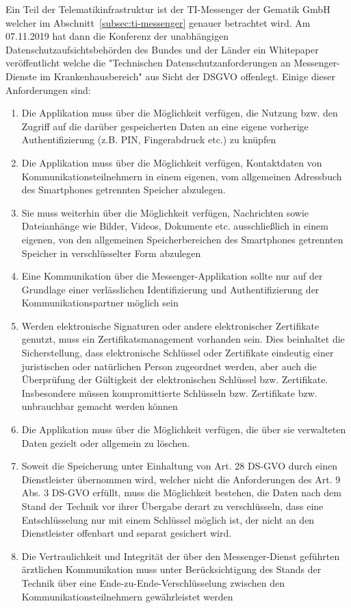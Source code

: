     Ein Teil der Telematikinfrastruktur ist der TI-Messenger der Gematik GmbH welcher im Abschnitt~\ref{subsec:ti-messenger} genauer betrachtet wird.
    Am 07.11.2019 hat dann die Konferenz der unabhängigen Datenschutzaufsichtsbehörden des Bundes und der Länder ein Whitepaper veröffentlicht welche die "Technischen Datenschutzanforderungen an Messenger-Dienste im Krankenhausbereich" aus Sicht der DSGVO offenlegt.
    Einige dieser Anforderungen sind:
    \begin{enumerate}[label={(\arabic*)}]
        \item Die Applikation muss über die Möglichkeit verfügen, die Nutzung bzw. den Zugriff
    auf die darüber gespeicherten Daten an eine eigene vorherige Authentifizierung (z.B.
    PIN, Fingerabdruck etc.) zu knüpfen
        \item Die Applikation muss über die Möglichkeit verfügen, Kontaktdaten von
    Kommunikationsteilnehmern in einem eigenen, vom allgemeinen Adressbuch des
    Smartphones getrennten Speicher abzulegen.
        \item Sie muss weiterhin über die Möglichkeit verfügen,
    Nachrichten sowie Dateianhänge wie Bilder, Videos, Dokumente etc. ausschließlich
    in einem eigenen, von den allgemeinen Speicherbereichen des Smartphones
    getrennten Speicher in verschlüsselter Form abzulegen
        \item Eine Kommunikation über die Messenger-Applikation sollte nur auf
    der Grundlage einer verlässlichen Identifizierung und Authentifizierung der
    Kommunikationspartner möglich sein
        \item Werden elektronische Signaturen oder andere elektronischer Zertifikate genutzt,
    muss ein Zertifikatsmanagement vorhanden sein. Dies beinhaltet die Sicherstellung,
    dass elektronische Schlüssel oder Zertifikate eindeutig einer juristischen oder
    natürlichen Person zugeordnet werden, aber auch die Überprüfung der Gültigkeit der
    elektronischen Schlüssel bzw. Zertifikate. Insbesondere müssen kompromittierte
    Schlüsseln bzw. Zertifikate bzw. unbrauchbar gemacht werden können
        \item Die Applikation muss über die Möglichkeit verfügen, die über sie verwalteten Daten
    gezielt oder allgemein zu löschen.
        \item Soweit die Speicherung unter Einhaltung von Art. 28 DS-GVO durch einen Dienstleister übernommen wird, welcher nicht die Anforderungen des Art. 9 Abs. 3 DS-GVO erfüllt,
    muss die Möglichkeit bestehen, die Daten nach dem Stand der Technik vor ihrer
    Übergabe derart zu verschlüsseln, dass eine Entschlüsselung nur mit einem
    Schlüssel möglich ist, der nicht an den Dienstleister offenbart und separat gesichert
    wird.
        \item Die Vertraulichkeit und Integrität der über den Messenger-Dienst geführten
    ärztlichen Kommunikation muss unter Berücksichtigung des Stands der Technik
    über eine Ende-zu-Ende-Verschlüsselung zwischen den
    Kommunikationsteilnehmern gewährleistet werden
    \end{enumerate}


